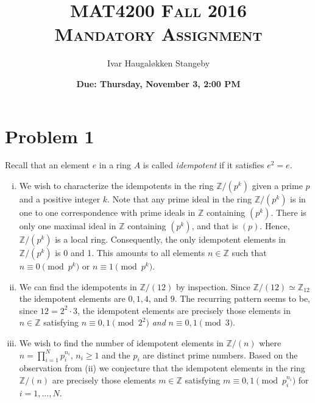 \documentclass{article}
\title{\textsc{MAT4200 Fall 2016 \\
Mandatory Assignment}}
\author{Ivar Haugal{\o}kken Stangeby}
\date{\small\textbf{Due: Thursday, November 3, 2:00 PM}}
\newcommand{\Z}{\mathbb{Z}}
\begin{document}
    \maketitle     
    \section*{Problem 1}
    \label{sec:problem_1}
    Recall that an element $e$ in a ring $A$ is called \emph{idempotent} if it
    satisfies $e^2 = e$.
    \begin{enumerate}[(i)]
        \item  We wish to characterize the idempotents in the ring $\Z / (p^k)$
            given a prime $p$ and a positive integer $k$.  Note that any prime
            ideal in the ring $\Z / (p^k)$ is in one to one correspondence with
            prime ideals in $\Z$ containing $(p^k)$. There is only one maximal
            ideal in $\Z$ containing $(p^k)$, and that is $(p)$. Hence, $\Z /
            (p^k)$ is a local ring. Consequently, the only idempotent elements
            in $\Z / (p^k)$ is 0 and 1. This amounts to all elements $n \in \Z$
            such that $n \equiv 0 \pmod{p^k}$ or $n \equiv 1 \pmod{p^k}$.
        
        \item We can find the idempotents in $\Z / (12)$ by inspection. Since
            $\Z / (12) \simeq \Z_{12}$ the idempotent elements are $0, 1, 4$,
            and $9$. The recurring pattern seems to be, since $12 = 2^2\cdot
            3$, the idempotent elements are precisely those elements in $n \in
            \Z$ satisfying $n \equiv 0, 1 \pmod{2^2}$ \emph{and} $n \equiv 0, 1
            \pmod{3}$.

        \item We wish to find the number of idempotent elements in $\Z / (n)$
            where $n = \prod_{i=1}^{N} p_i^{n_i}$, $n_i \geq 1$ and the $p_i$
            are distinct prime numbers. Based on the observation from (ii) we
            conjecture that the idempotent elements in the ring $\Z / (n)$ are
            precisely those elements $m \in \Z$ satisfying $m \equiv 0, 1
            \pmod{p_i^{n_i}}$ for $i = 1, \ldots, N$. 


\end{enumerate}
\end{document}

